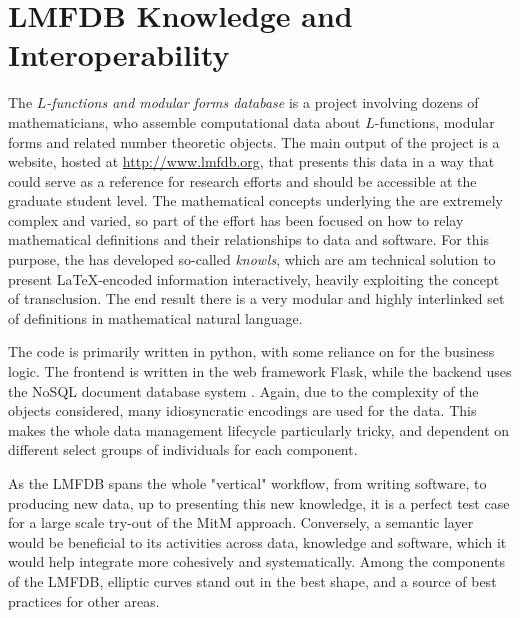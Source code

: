 \section{LMFDB Knowledge and Interoperability}\label{sec:lmfdb}
The \emph{$L$-functions and modular forms database} is a project involving dozens of
mathematicians, who assemble computational data about $L$-functions, modular forms and
related number theoretic objects. The main output of the project is a website, hosted at
\url{http://www.lmfdb.org}, that presents this data in a way that could serve as a
reference for research efforts and should be accessible at the graduate student level.
The mathematical concepts underlying the \LMFDB are extremely complex and varied, so part
of the effort has been focused on how to relay mathematical definitions and their
relationships to data and software. For this purpose, the \LMFDB has developed so-called
\emph{knowls}, which are am technical solution to present \LaTeX-encoded information
interactively, heavily exploiting the concept of transclusion. The end result there is a
very modular and highly interlinked set of definitions in mathematical natural language.
 
The \LMFDB code is primarily written in \textsf{python}, with some reliance on \Sage for
the business logic. The frontend is written in the web framework Flask, while the backend
uses the NoSQL document database system \Mongo \cite{lmfdb-repo}. Again, due to the
complexity of the objects considered, many idiosyncratic encodings are used for the
data. This makes the whole data management lifecycle particularly tricky, and dependent on
different select groups of individuals for each component.

As the LMFDB spans the whole "vertical" workflow, from writing software, to producing new
data, up to presenting this new knowledge, it is a perfect test case for a large scale
try-out of the MitM approach. Conversely, a semantic layer would be beneficial to its
activities across data, knowledge and software, which it would help integrate more
cohesively and systematically. Among the components of the LMFDB, elliptic curves stand
out in the best shape, and a source of best practices for other areas. 


